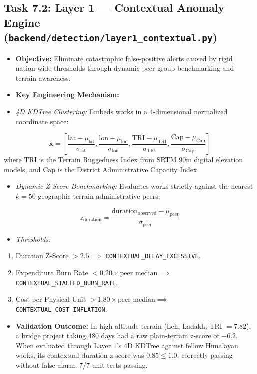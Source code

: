 \documentclass[11pt,a4paper]{article}
\begin{document}
\subsection{Task 7.2: Layer 1 --- Contextual Anomaly Engine (\texttt{backend/detection/layer1\_contextual.py})}
\begin{itemize}[leftmargin=1.5em, itemsep=2pt, topsep=3pt]
\item \textbf{Objective:} Eliminate catastrophic false-positive alerts caused by rigid nation-wide thresholds through dynamic peer-group benchmarking and terrain awareness.
\item \textbf{Key Engineering Mechanism:}
\item \textit{4D KDTree Clustering:} Embeds works in a 4-dimensional normalized coordinate space:
\end{itemize}
\[ \mathbf{x} = \left[ \frac{\text{lat} - \mu_{\text{lat}}}{\sigma_{\text{lat}}}, \frac{\text{lon} - \mu_{\text{lon}}}{\sigma_{\text{lon}}}, \frac{\text{TRI} - \mu_{\text{TRI}}}{\sigma_{\text{TRI}}}, \frac{\text{Cap} - \mu_{\text{Cap}}}{\sigma_{\text{Cap}}} \right] \]
where $\text{TRI}$ is the Terrain Ruggedness Index from SRTM 90m digital elevation models, and $\text{Cap}$ is the District Administrative Capacity Index.
\begin{itemize}[leftmargin=1.5em, itemsep=2pt, topsep=3pt]
\item \textit{Dynamic Z-Score Benchmarking:} Evaluates works strictly against the nearest $k=50$ geographic-terrain-administrative peers:
\end{itemize}
\[ z_{\text{duration}} = \frac{\text{duration}_{\text{observed}} - \mu_{\text{peer}}}{\sigma_{\text{peer}}} \]
\begin{itemize}[leftmargin=1.5em, itemsep=2pt, topsep=3pt]
\item \textit{Thresholds:}
\end{itemize}
\begin{enumerate}[leftmargin=1.5em, itemsep=2pt, topsep=3pt]
\item Duration Z-Score $> 2.5 \implies$ \texttt{CONTEXTUAL\_DELAY\_EXCESSIVE}.
\item Expenditure Burn Rate $< 0.20 \times \text{peer median} \implies$ \texttt{CONTEXTUAL\_STALLED\_BURN\_RATE}.
\item Cost per Physical Unit $> 1.80 \times \text{peer median} \implies$ \texttt{CONTEXTUAL\_COST\_INFLATION}.
\end{enumerate}
\begin{itemize}[leftmargin=1.5em, itemsep=2pt, topsep=3pt]
\item \textbf{Validation Outcome:} In high-altitude terrain (Leh, Ladakh; TRI $= 7.82$), a bridge project taking 480 days had a raw plain-terrain z-score of $+6.2$. When evaluated through Layer 1's 4D KDTree against fellow Himalayan works, its contextual duration z-score was $0.85 \le 1.0$, correctly passing without false alarm. 7/7 unit tests passing.
\end{itemize}
\end{document}
